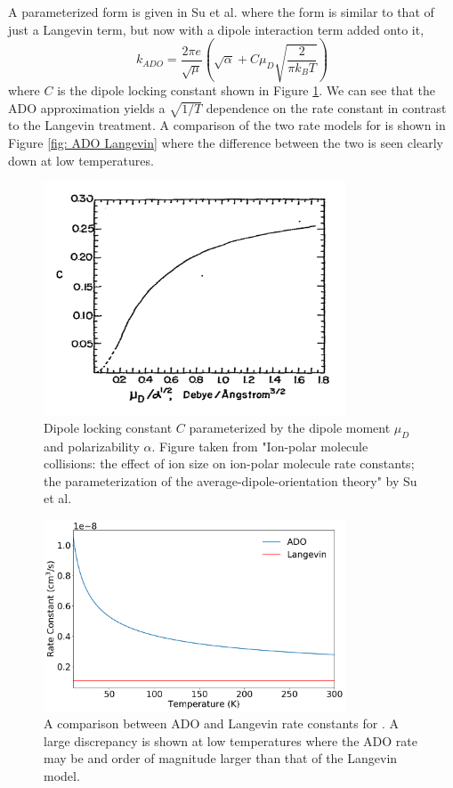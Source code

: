 A parameterized form is given in Su et al. where the form is similar to that of just a Langevin term, but now with a dipole interaction term added onto it,\cite{Su1973a}
\begin{equation}
    k_{ADO} = \frac{2 \pi e}{\sqrt{\mu}}\left(\sqrt{\alpha}+C \mu_D\sqrt{\frac{2}{\pi k_B T}}\right)
    \label{eq: k ADO}
\end{equation}
where $C$ is the dipole locking constant shown in Figure \ref{fig: C}.\cite{Su1973a}\cite{Troe1985} We can see that the ADO approximation yields a $\sqrt{1/T}$ dependence on the rate constant in contrast to the Langevin treatment. A comparison of the two rate models for  is shown in Figure \ref{fig: ADO Langevin} where the difference between the two is seen clearly down at low temperatures.

\begin{figure}[H]
	\label{fig: C}
	\centering
	\includegraphics[width=0.8\textwidth]{images/ADO_C.pdf}
	\caption{Dipole locking constant $C$ parameterized by the dipole moment $\mu_D$ and polarizability $\alpha$. Figure taken from "Ion-polar molecule collisions: the effect of ion size on ion-polar molecule rate constants; the parameterization of the average-dipole-orientation theory" by Su et al.\cite{Su1973a}}
\end{figure}

\begin{figure}[H]
	\centering
	\includegraphics[width=0.8\textwidth]{images/ADO_Langevin_compare.png}
	\caption{A comparison between ADO and Langevin rate constants for . A large discrepancy is shown at low temperatures where the ADO rate may be and order of magnitude larger than that of the Langevin model.}
\end{figure}


